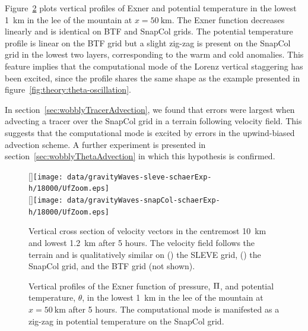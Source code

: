 Figure~\ref{fig:gw:exner-theta} plots vertical profiles of Exner and potential temperature in the lowest \SI{1}{\kilo\meter} in the lee of the mountain at $x = \SI{50}{\kilo\meter}$.  The Exner function decreases linearly and is identical on BTF and SnapCol grids.  The potential temperature profile is linear on the BTF grid but a slight zig-zag is present on the SnapCol grid in the lowest two layers, corresponding to the warm and cold anomalies.  
This feature implies that the computational mode of the Lorenz vertical staggering has been excited, since the profile shares the same shape as the example presented in figure~\ref{fig:theory:theta-oscillation}.

In section~\ref{sec:wobblyTracerAdvection}, we found that errors were largest when advecting a tracer over the SnapCol grid in a terrain following velocity field.  This suggests that the computational mode is excited by errors in the upwind-biased advection scheme.  A further experiment is presented in section~\ref{sec:wobblyThetaAdvection} in which this hypothesis is confirmed. 

\begin{figure}
	\captionsetup[subfigure]{position=b}
	\centering
	[\textwidth]{\texttt{[image: data/gravityWaves-sleve-schaerExp-h/18000/UfZoom.eps]}} \\
	[\textwidth]{\texttt{[image: data/gravityWaves-snapCol-schaerExp-h/18000/UfZoom.eps]}}
%
	\caption{Vertical cross section of velocity vectors in the centremost \SI{10}{\kilo\meter} and lowest \SI{1.2}{\kilo\meter} after 5 hours.  The velocity field follows the terrain and is qualitatively similar on () the SLEVE grid, () the SnapCol grid, and the BTF grid (not shown).}
	\label{fig:gw:flow}
\end{figure}

\begin{figure}
	\centering
	
	\caption{Vertical profiles of the Exner function of pressure, $\Pi$, and potential temperature, $\theta$, in the lowest \SI{1}{\kilo\meter} in the lee of the mountain at $x = \SI{50}{\kilo\meter}$ after 5 hours.  The computational mode is manifested as a zig-zag in potential temperature on the SnapCol grid.}
	\label{fig:gw:exner-theta}
\end{figure}


